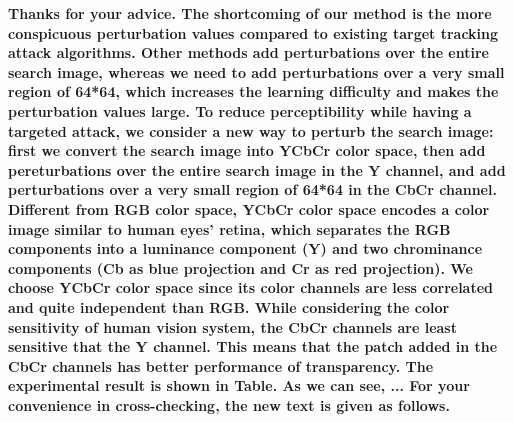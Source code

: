 \documentclass[12pt]{article}
\begin{document}
\textbf{
Thanks for your advice.
The shortcoming of our method is the more conspicuous perturbation values compared to existing target tracking attack algorithms.
Other methods add perturbations over the entire search image, whereas we need to add perturbations over a very small region of 64*64, which increases the learning difficulty and makes the perturbation values large.
To reduce perceptibility while having a targeted attack, we consider a new way to perturb the search image: first we convert the search image into YCbCr color space, then add pereturbations over the entire search image in the Y channel, and add perturbations over a very small region of 64*64 in the CbCr channel.
Different from RGB color space, YCbCr color space encodes a color image similar to human eyes’ retina, which separates the RGB components into a luminance component (Y) and two chrominance components (Cb as blue projection and Cr as red projection).
We choose YCbCr color space since its color channels are less correlated and quite independent than RGB.
While considering the color sensitivity of human vision system, the CbCr channels are least sensitive that the Y channel. This means that the patch added in the CbCr channels has better performance of transparency.
The experimental result is shown in Table. As we can see, ...
For your convenience in cross-checking, the new text is given as follows.}
\end{document}
